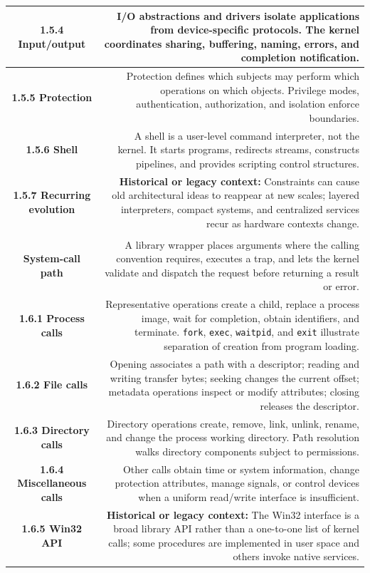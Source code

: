 \documentclass[10pt,letterpaper]{article}
\begin{document}
\begin{longtable}{C N}
\textbf{1.5.4 Input/output} & I/O abstractions and drivers isolate applications from device-specific protocols. The kernel coordinates sharing, buffering, naming, errors, and completion notification.\\\hline
\textbf{1.5.5 Protection} & Protection defines which subjects may perform which operations on which objects. Privilege modes, authentication, authorization, and isolation enforce boundaries.\\\hline
\textbf{1.5.6 Shell} & A shell is a user-level command interpreter, not the kernel. It starts programs, redirects streams, constructs pipelines, and provides scripting control structures.\\\hline
\textbf{1.5.7 Recurring evolution} & \textcolor{legacy}{\textbf{Historical or legacy context:}} Constraints can cause old architectural ideas to reappear at new scales; layered interpreters, compact systems, and centralized services recur as hardware contexts change.\\\hline
{}\\*\hline
\textbf{System-call path} & A library wrapper places arguments where the calling convention requires, executes a trap, and lets the kernel validate and dispatch the request before returning a result or error.\\\hline
\textbf{1.6.1 Process calls} & Representative operations create a child, replace a process image, wait for completion, obtain identifiers, and terminate. \texttt{fork}, \texttt{exec}, \texttt{waitpid}, and \texttt{exit} illustrate separation of creation from program loading.\\\hline
\textbf{1.6.2 File calls} & Opening associates a path with a descriptor; reading and writing transfer bytes; seeking changes the current offset; metadata operations inspect or modify attributes; closing releases the descriptor.\\\hline
\textbf{1.6.3 Directory calls} & Directory operations create, remove, link, unlink, rename, and change the process working directory. Path resolution walks directory components subject to permissions.\\\hline
\textbf{1.6.4 Miscellaneous calls} & Other calls obtain time or system information, change protection attributes, manage signals, or control devices when a uniform read/write interface is insufficient.\\\hline
\textbf{1.6.5 Win32 API} & \textcolor{legacy}{\textbf{Historical or legacy context:}} The Win32 interface is a broad library API rather than a one-to-one list of kernel calls; some procedures are implemented in user space and others invoke native services.\\\hline

\end{longtable}
\end{document}
